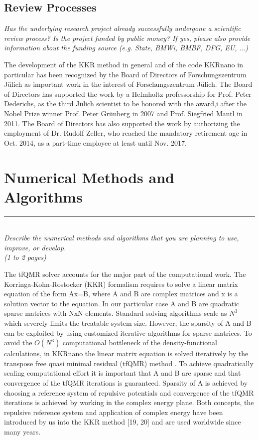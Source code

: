 \documentclass [a4paper, 12pt]{article}
\begin{document}
\subsection{Review Processes}
\textit{Has the underlying research project already successfully undergone a scientific review process? Is the project funded by public money?
If yes, please also provide information about the funding source
(e.g. State, BMWi, BMBF, DFG, EU, $\dots$)}

The development of the KKR method in general and of the code KKRnano in particular has been recognized 
by the Board of Directors of Forschungszentrum J{\"u}lich as important work in the interest of 
Forschungszentrum J{\"u}lich. The Board of Directors has supported the work by a Helmholtz professorship 
for Prof. Peter Dederichs, as the third Jülich scientist to be honored with the award,i
after the Nobel Prize winner Prof. Peter Grünberg in 2007 and Prof. Siegfried Mantl in 2011. 
The Board of Directors has also supported the work by authorizing the employment of Dr. Rudolf Zeller, 
who reached the mandatory retirement age in Oct. 2014, as a part-time employee at least until Nov. 2017. 


\section{Numerical Methods and Algorithms} 
\rule{\textwidth}{0.4pt}\\
\textit{Describe the numerical methods and algorithms that you are planning to use, improve, or develop.}\\
 
\textit{(1 to 2 pages)}
\bigskip

The tfQMR solver accounts for the major part of the computational work.
The Korringa-Kohn-Rostocker (KKR) formalism requires to solve a linear matrix
equation of the form Ax=B, where A and B are complex matrices and x is a solution
vector to the equation. In our particular case A and B are quadratic sparse matrices with NxN elements.
Standard solving algorithms scale as $N^3$ which severely limits the treatable system size.
However, the sparsity of A and B can be exploited by using customized iterative algorithms for sparse matrices.
To avoid the $O(N^3)$ computational bottleneck of the density-functional calculations,
in KKRnano the linear matrix equation is solved iteratively by the
transpose free quasi minimal residual (tfQMR) method \cite{freund_qmr:_1991}.
To achieve quadratically scaling computational effort it is important that A and B are sparse
and that convergence of the tfQMR iterations is guaranteed. Sparsity of A
is achieved by choosing a reference system of repulsive potentials and convergence
of the tfQMR iterations is achieved by working in the complex energy plane. Both concepts,
the repulsive reference system and application of complex energy have been
introduced by us into the KKR method [19, 20] and are used worldwide since many years. 
\end{document}
